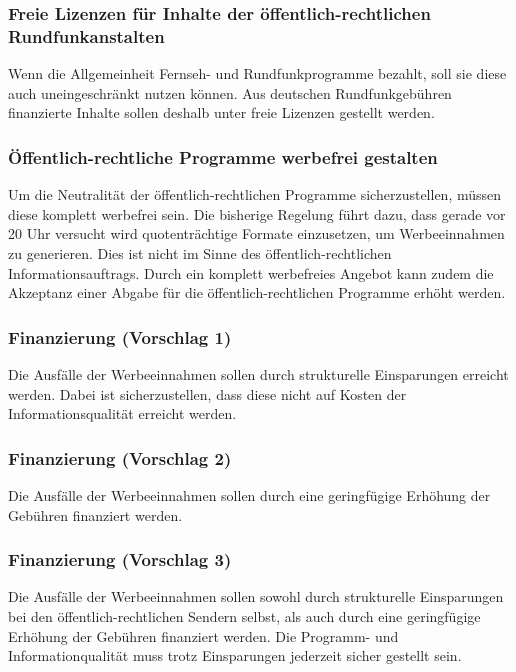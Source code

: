\newpage
{}

\subsubsection{Freie Lizenzen für Inhalte der öffentlich-rechtlichen Rundfunkanstalten}
\abstimmung
Wenn die Allgemeinheit Fernseh- und Rundfunkprogramme bezahlt, soll sie diese auch uneingeschränkt nutzen können. Aus deutschen Rundfunkgebühren finanzierte Inhalte sollen deshalb unter freie Lizenzen gestellt werden.
 

\subsubsection{Öffentlich-rechtliche Programme werbefrei gestalten} 	\abstimmung
Um die Neutralität der öffentlich-rechtlichen Programme sicherzustellen, müssen diese komplett werbefrei sein. Die bisherige Regelung führt dazu, dass gerade vor 20 Uhr versucht wird quotenträchtige Formate einzusetzen, um Werbeeinnahmen zu generieren. Dies ist nicht im Sinne des öffentlich-rechtlichen Informationsauftrags. Durch ein komplett werbefreies Angebot kann zudem die Akzeptanz einer Abgabe für die öffentlich-rechtlichen Programme erhöht werden.

\subsubsection{Finanzierung (Vorschlag 1)}
\abstimmung
Die Ausfälle der Werbeeinnahmen sollen durch strukturelle Einsparungen erreicht werden. Dabei ist sicherzustellen, dass diese nicht auf Kosten der Informationsqualität erreicht werden.

\subsubsection{Finanzierung (Vorschlag 2)}
\abstimmung
Die Ausfälle der Werbeeinnahmen sollen durch eine geringfügige Erhöhung der Gebühren finanziert werden.

\subsubsection{Finanzierung (Vorschlag 3)}
\abstimmung
Die Ausfälle der Werbeeinnahmen sollen sowohl durch strukturelle Einsparungen bei den öffentlich-rechtlichen Sendern selbst, als auch durch eine geringfügige Erhöhung der Gebühren finanziert werden. Die Programm- und Informationqualität muss trotz Einsparungen jederzeit sicher gestellt sein.
 
